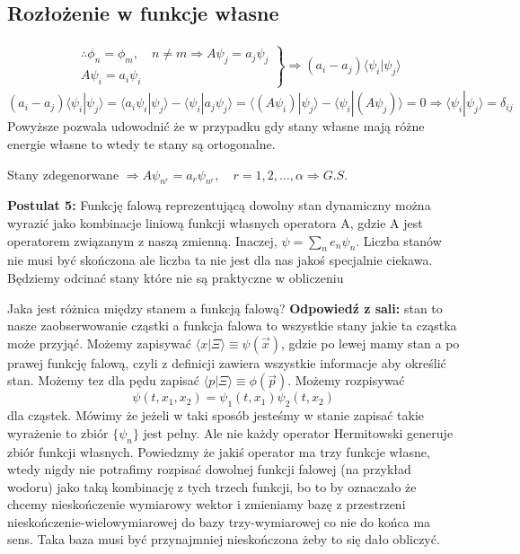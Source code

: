 \subsection{Rozłożenie w funkcje własne}
\begin{align*}
	&\left.
	\begin{aligned}
		\therefore \phi_n = \phi_m, \quad n \neq m \Rightarrow A \psi_j = a_j \psi_j \\
		A \psi_i = a_i \psi_i
	\end{aligned}
	\right\}
	\Rightarrow (a_i - a_j)\langle \psi_i | \psi_j \rangle 
\end{align*}
\begin{equation}
	(a_i - a_j)\langle \psi_i | \psi_j \rangle  = \langle a_i \psi_i | \psi_j \rangle - \langle \psi_i | a_j \psi_j \rangle = \langle (A \psi_i) | \psi_j \rangle - \langle \psi_i | (A \psi_j) \rangle = 0 \Rightarrow \langle \psi_i | \psi_j \rangle = \delta_{ij}
\end{equation}
Powyższe pozwala udowodnić że w przypadku gdy stany własne mają różne energie własne to wtedy te stany są ortogonalne.

Stany zdegenorwane $\Rightarrow A\psi_{n^r} = a_r \psi_{n^r}, \quad r = 1, 2, \dots, \alpha \Rightarrow G.S. $

\textbf{Postulat 5:} Funkcję falową reprezentującą dowolny stan dynamiczny można wyrazić jako kombinacje liniową funkcji własnych operatora A, gdzie A jest operatorem związanym z naszą zmienną. Inaczej, $\psi = \sum_n e_n \psi_n$. Liczba stanów nie musi być skończona ale liczba ta nie jest dla nas jakoś specjalnie ciekawa. Będziemy odcinać stany które nie są praktyczne w obliczeniu

Jaka jest różnica między stanem a funkcją falową? \textbf{Odpowiedź z sali:} stan to nasze zaobserwowanie cząstki a funkcja falowa to wszystkie stany jakie ta cząstka może przyjąć. Możemy zapisywać $\langle x | \Xi \rangle \equiv \psi (\vec{x})$, gdzie po lewej mamy stan a po prawej funkcję falową, czyli z definicji zawiera wszystkie informacje aby określić stan. Możemy tez dla pędu zapisać $\langle p | \Xi \rangle \equiv \phi (\vec{p})$. Możemy rozpisywać $$ \psi(t, x_1, x_2) = \psi_1(t, x_1) \psi_2(t, x_2) $$ dla cząstek.
Mówimy że jeżeli w taki sposób jesteśmy w stanie zapisać takie wyrażenie to zbiór $\{\psi_n\}$ jest pełny. Ale nie każdy operator Hermitowski generuje zbiór funkcji własnych. Powiedzmy że jakiś operator ma trzy funkcje własne, wtedy nigdy nie potrafimy rozpisać dowolnej funkcji falowej (na przykład wodoru) jako taką kombinację z tych trzech funkcji, bo to by oznaczało że chcemy nieskończenie wymiarowy wektor i zmieniamy bazę z przestrzeni nieskończenie-wielowymiarowej do bazy trzy-wymiarowej co nie do końca ma sens. Taka baza musi być przynajmniej nieskończona żeby to się dało obliczyć.

